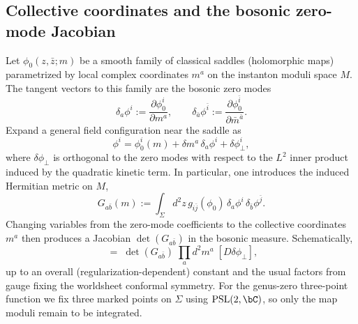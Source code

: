 \documentclass[12pt]{article}
\begin{document}
\subsection{Collective coordinates and the bosonic zero-mode Jacobian}
Let $\phi_0(z,\bar z;m)$ be a smooth family of classical saddles (holomorphic
maps) parametrized by local complex coordinates $m^a$ on the instanton moduli
space $M$. The tangent vectors to this family are the bosonic zero modes
\begin{equation*}
  \delta_a\phi^i := \frac{\partial \phi_0^i}{\partial m^a},
  \qquad
  \delta_{\bar a}\phi^{\bar i} := \frac{\partial \phi_0^{\bar i}}{\partial \bar m^{\bar a}}.
\end{equation*}
Expand a general field configuration near the saddle as
\begin{equation*}
  \phi^i=\phi_0^i(m)+\delta m^a\,\delta_a\phi^i+\delta\phi_\perp^i,
\end{equation*}
where $\delta\phi_\perp$ is orthogonal to the zero modes with respect to the
$L^2$ inner product induced by the quadratic kinetic term. In particular, one
introduces the induced Hermitian metric on $M$,
\begin{equation*}
  G_{a\bar b}(m):=\int_\Sigma d^2z\,
  g_{i\bar j}(\phi_0)\,\delta_a\phi^i\,\delta_{\bar b}\phi^{\bar j}.
\end{equation*}
Changing variables from the zero-mode coefficients to the collective
coordinates $m^a$ then produces a Jacobian $\det(G_{a\bar b})$ in the bosonic
measure. Schematically,
\begin{equation*}
  [D\phi]\;=\;\det(G_{a\bar b})\;\prod_a d^2 m^a\; [D\delta\phi_\perp],
\end{equation*}
up to an overall (regularization-dependent) constant and the usual factors from
gauge fixing the worldsheet conformal symmetry. For the genus-zero three-point
function we fix three marked points on $\Sigma$ using $\mathrm{PSL}(2,\bC)$, so
only the map moduli remain to be integrated.
\end{document}
